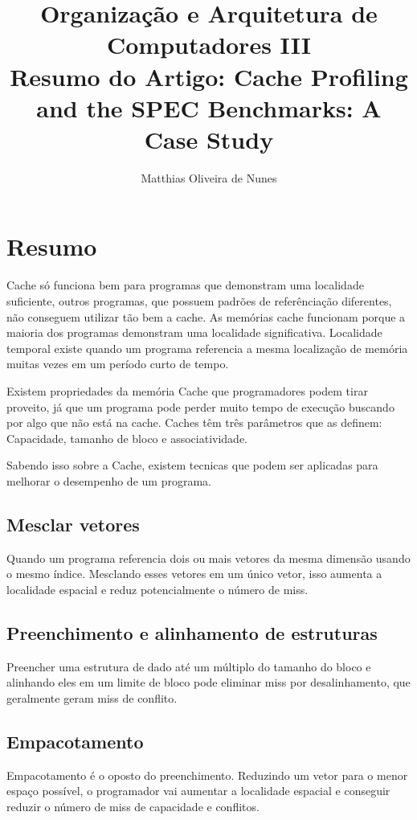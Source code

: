 \documentclass[12pt]{article}
\title{Organização e Arquitetura de Computadores III\\ Resumo do Artigo: Cache Profiling and the SPEC Benchmarks: A Case Study}
\author{Matthias Oliveira de Nunes}
\begin{document}
\maketitle

\section{Resumo}

Cache só funciona bem para programas que demonstram uma localidade suficiente,
outros programas, que possuem padrões de referênciação diferentes, não conseguem
utilizar tão bem a cache. As memórias cache funcionam porque a maioria dos
programas demonstram uma localidade significativa. Localidade temporal existe
quando um programa referencia a mesma localização de memória muitas vezes em um
período curto de tempo.

Existem propriedades da memória Cache que programadores podem tirar proveito, já
que um programa pode perder muito tempo de execução buscando por algo que não
está na cache. Caches têm três parâmetros que as definem: Capacidade, tamanho de
bloco e associatividade.

Sabendo isso sobre a Cache, existem tecnicas que podem ser aplicadas para
melhorar o desempenho de um programa.

\subsection{Mesclar vetores}

Quando um programa referencia dois ou mais vetores da mesma dimensão usando o
mesmo índice. Mesclando esses vetores em um único vetor, isso aumenta a
localidade espacial e reduz potencialmente o número de miss.

\subsection{Preenchimento e alinhamento de estruturas}

Preencher uma estrutura de dado até um múltiplo do tamanho do bloco e alinhando
eles em um limite de bloco pode eliminar miss por desalinhamento, que geralmente
geram miss de conflito.

\subsection{Empacotamento}

Empacotamento é o oposto do preenchimento. Reduzindo um vetor para o menor
espaço possível, o programador vai aumentar a localidade espacial e conseguir
reduzir o número de miss de capacidade e conflitos.
\end{document}
